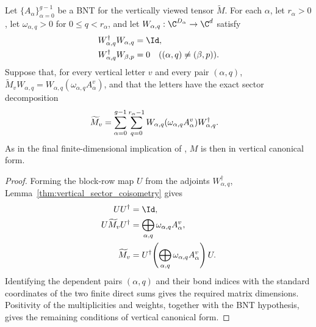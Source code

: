 \begin{lemma}
    \label{thm:vertical_cf_of_grouped_orthogonal_sectors}
    \leanok
    Let $\{A_\alpha\}_{\alpha=0}^{g-1}$ be a BNT for the vertically viewed
    tensor $\widetilde M$. For each $\alpha$, let $r_\alpha>0$, let
    $\omega_{\alpha,q}>0$ for $0\leq q<r_\alpha$, and let
    $W_{\alpha,q}:\C^{D_\alpha}\to\C^d$ satisfy
    \begin{align}
        W_{\alpha,q}^\dagger W_{\alpha,q} & =\Id,
        \notag                                    \\
        W_{\alpha,q}^\dagger W_{\beta,p}  & =0
        \quad((\alpha,q)\ne(\beta,p)).
        \notag
    \end{align}
    Suppose that, for every vertical letter $v$ and every pair $(\alpha,q)$,
    $\widetilde M_vW_{\alpha,q}
        =W_{\alpha,q}(\omega_{\alpha,q}A_\alpha^v)$, and that the letters have
    the exact sector decomposition
    \begin{align}
        \widetilde M_v
         & =\sum_{\alpha=0}^{g-1}\sum_{q=0}^{r_\alpha-1}
        W_{\alpha,q}(\omega_{\alpha,q}A_\alpha^v)
        W_{\alpha,q}^\dagger.
        \notag
    \end{align}
    As in the final finite-dimensional implication of
    \cite[Proposition~4.13, lines~1863--1870]{Cirac2016MPDO_arXiv}, $M$ is then
    in vertical canonical form.
\end{lemma}

\begin{proof}
    \leanok
    Forming the block-row map $U$ from the adjoints
    $W_{\alpha,q}^\dagger$, Lemma~\ref{thm:vertical_sector_coisometry}
    gives
    \begin{align}
        UU^\dagger & =\Id,
        \notag                                                                                  \\
        U\widetilde M_vU^\dagger
                   & =\bigoplus_{\alpha,q}\omega_{\alpha,q}A_\alpha^v,
        \notag                                                                                  \\
        \widetilde M_v
                   & =U^\dagger\!\left(\bigoplus_{\alpha,q}\omega_{\alpha,q}A_\alpha^v\right)U.
        \notag
    \end{align}
    Identifying the dependent pairs $(\alpha,q)$ and their bond indices with
    the standard coordinates of the two finite direct sums gives the required
    matrix dimensions. Positivity of the multiplicities and weights, together
    with the BNT hypothesis, gives the remaining conditions of vertical
    canonical form.
\end{proof}

